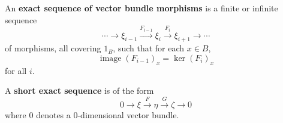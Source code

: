 An \textbf{exact sequence of vector bundle morphisms} is a finite or infinite sequence
$$\cdots \to \xi_{i-1} \xrightarrow{F_{i-1}} \xi_i \xrightarrow{F_i} \xi_{i+1} \to \cdots$$
of morphisms, all covering $1_B$, such that for each $x \in B$,
$$\operatorname{image}(F_{i-1})_x = \ker(F_i)_x$$
for all $i$.

A \textbf{short exact sequence} is of the form
$$0 \to \xi \xrightarrow{F} \eta \xrightarrow{G} \zeta \to 0$$
where $0$ denotes a $0$-dimensional vector bundle.
